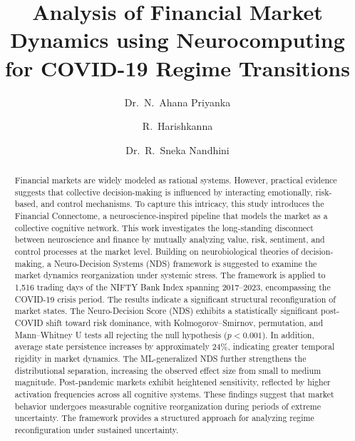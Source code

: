 \documentclass[runningheads,10pt]{llncs}
\begin{document}
\title{\normalsize Analysis of Financial Market Dynamics using Neurocomputing for COVID-19 Regime Transitions}

\author{Dr.~N.~Ahana Priyanka \and
R.~Harishkanna \and
Dr.~R.~Sneka Nandhini}




\maketitle

\vspace{-15pt}
\begin{abstract}
Financial markets are widely modeled as rational systems. However, practical evidence suggests that collective decision-making is influenced by interacting emotionally, risk-based, and control mechanisms. To capture this intricacy, this study introduces the Financial Connectome, a neuroscience-inspired pipeline that models the market as a collective cognitive network. This work investigates the long-standing disconnect between neuroscience and finance by mutually analyzing value, risk, sentiment, and control processes at the market level. Building on neurobiological theories of decision-making, a Neuro-Decision Systems (NDS) framework is suggested to examine the market dynamics reorganization under systemic stress. The framework is applied to 1,516 trading days of the NIFTY Bank Index spanning 2017--2023, encompassing the COVID-19 crisis period. The results indicate a significant structural reconfiguration of market states. The Neuro-Decision Score (NDS) exhibits a statistically significant post-COVID shift toward risk dominance, with Kolmogorov--Smirnov, permutation, and Mann--Whitney U tests all rejecting the null hypothesis ($p < 0.001$). In addition, average state persistence increases by approximately 24\%, indicating greater temporal rigidity in market dynamics. The ML-generalized NDS further strengthens the distributional separation, increasing the observed effect size from small to medium magnitude. Post-pandemic markets exhibit heightened sensitivity, reflected by higher activation frequencies across all cognitive systems. These findings suggest that market behavior undergoes measurable cognitive reorganization during periods of extreme uncertainty. The framework provides a structured approach for analyzing regime reconfiguration under sustained uncertainty.

\end{abstract}
\end{document}
